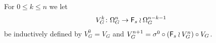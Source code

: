 \documentclass[a4paper,10pt]{article}%
\begin{document}


\begin{notation}\label{INDVNG NOT}
	For $0 \leq k \leq n$ we let 
\[
	V_{G}^{k} \colon \Omega_{G}^{n} \to \mathsf{F}_s \wr \Omega_{G}^{n-k-1}
\]
be inductively defined by $V_{G}^{0} = V_G$ and
$V_{G}^{n+1} = \sigma^0 \circ (\mathsf{F}_s \wr V_{G}^{n}) \circ V_G$.
\end{notation}
\end{document}
